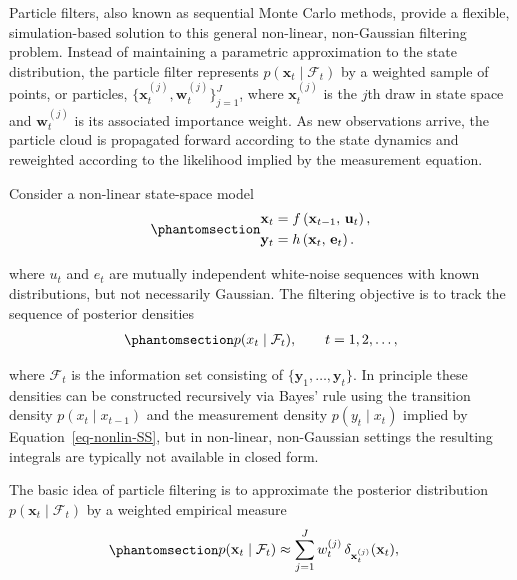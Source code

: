 \documentclass[
  letterpaper,
  DIV=11,
  numbers=noendperiod]{scrreprt}
\begin{document}
Particle filters, also known as sequential Monte Carlo methods, provide
a flexible, simulation-based solution to this general non-linear,
non-Gaussian filtering problem. Instead of maintaining a parametric
approximation to the state distribution, the particle filter represents
\(p(\mathbf{x}_t \mid \mathcal{F}_t)\) by a weighted sample of points,
or particles, \(\{\mathbf{x}_t^{(j)}, \mathbf{w}_t^{(j)}\}_{j=1}^J\),
where \(\mathbf{x}_t^{(j)}\) is the \(j\)th draw in state space and
\(\mathbf{w}_t^{(j)}\) is its associated importance weight. As new
observations arrive, the particle cloud is propagated forward according
to the state dynamics and reweighted according to the likelihood implied
by the measurement equation.

Consider a non-linear state-space model
\begin{equation}\protect\phantomsection\label{eq-nonlin-SS}{
\begin{align}
  \mathbf{x}_{t} &= f\left(\mathbf{x}_{t-1}, \,\mathbf{u}_t \right), \\
  \mathbf{y}_{t} &= h\left(\mathbf{x}_{t}, \,\mathbf{e}_t \right).
\end{align}
}\end{equation}

where \(u_t\) and \(e_t\) are mutually independent white-noise sequences
with known distributions, but not necessarily Gaussian. The filtering
objective is to track the sequence of posterior densities
\begin{equation}\protect\phantomsection\label{eq-nonlin-density}{
\begin{align}
p(x_t \mid \mathcal{F}_t), \qquad t = 1, 2, \ldots,
\end{align}
}\end{equation}

where \(\mathcal{F}_t\) is the information set consisting of
\(\{\mathbf{y}_1, \ldots, \mathbf{y}_t\}\). In principle these densities
can be constructed recursively via Bayes' rule using the transition
density \(p(x_t \mid x_{t-1})\) and the measurement density
\(p(y_t \mid x_t)\) implied by Equation~\ref{eq-nonlin-SS}, but in
non-linear, non-Gaussian settings the resulting integrals are typically
not available in closed form.

The basic idea of particle filtering is to approximate the posterior
distribution \(p(\mathbf{x}_t \mid \mathcal{F}_t)\) by a weighted
empirical measure
\begin{equation}\protect\phantomsection\label{eq-gen-0145}{
\begin{align}
    p(\mathbf{x}_t \mid \mathcal{F}_t)
    &\approx \sum_{j=1}^J w_t^{(j)} \, \delta_{\mathbf{x}_t^{(j)}}(\mathbf{x}_t),
\end{align}
}\end{equation}
\end{document}
